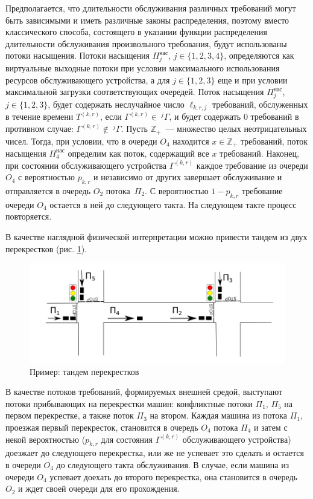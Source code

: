 \documentclass[a4paper,12pt,russian]{extarticle}
\newcommand{\ga}[1]{\Gamma^{\left( #1 \right)} }
\begin{document}
Предполагается, что длительности обслуживания различных требований могут быть зависимыми и иметь различные законы распределения, поэтому вместо классического способа, состоящего в указании функции распределения длительности обслуживания произвольного требования, будут использованы потоки насыщения. Потоки насыщения $\Pi^{\mathrm{\text{нас}}}_j$, $j \in \{1,2,3,4\}$, определяются как виртуальные выходные потоки при 
условии максимального использования ресурсов обслуживающего устройства, а для $j\in \{1, 2, 3\}$ еще и при условии максимальной загрузки соответствующих очередей. Поток насыщения $\Pi^{\mathrm{\text{нас}}}_j$, $j\in \{1,2,3\}$, будет содержать неслучайное число $\ell_{k,r,j}$ требований, обслуженных в течение времени $T^{(k,r)}$, если $\ga{k,r} \in~^j\Gamma$, и будет содержать $0$ требований в противном случае: $\ga{k,r} \notin ~^j\Gamma$. Пусть $\mathbb{Z}_+$~--- множество целых неотрицательных чисел. Тогда, при условии, что в очереди $O_4$ находится $x \in \mathbb{Z}_+$ требований, поток насыщения $\Pi^{\mathrm{\text{нас}}}_4$ определим как поток, содержащий все $x$ требований.
Наконец, при состоянии обслуживающего устройства $\ga{k,r}$ каждое требование из очереди $O_4$ с вероятностью $p_{k,r}$ и независимо от других завершает обслуживание и отправляется в очередь $O_2$ потока~$\Pi_2$. С вероятностью $1-p_{k,r}$ требование очереди $O_4$ остается в ней до следующего такта. На следующем такте процесс повторяется.

В качестве наглядной физической интерпретации можно привести тандем из двух перекрестков (рис. \ref{crossroads}).
\begin{figure}[h]
\includegraphics[scale=0.5]{Crossroads.png} 
\caption{Пример: тандем перекрестков}
\label{crossroads}
\end{figure}
В качестве потоков требований, формируемых внешней средой, выступают потоки прибывающих на перекрестки машин: конфликтные потоки $\Pi_1$, $\Pi_5$ на первом перекрестке, а также поток $\Pi_3$ на втором. Каждая машина из потока $\Pi_1$, проезжая первый перекресток, становится в очередь $O_4$ потока $\Pi_4$ и затем с некой вероятностью ($p_{k,r}$ для состояния $\ga{k,r}$ обслуживающего устройства) доезжает до следующего перекрестка, или же не успевает это сделать и остается в очереди $O_4$ до следующего такта обслуживания. В случае, если машина из очереди $O_4$ успевает доехать до второго перекрестка, она становится в очередь $O_2$ и ждет своей очереди для его прохождения.
\end{document}
